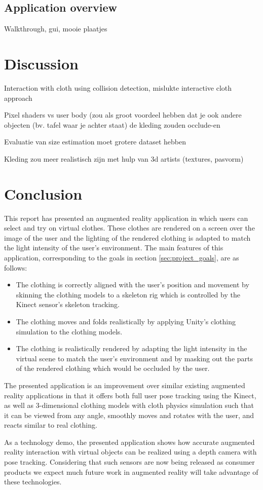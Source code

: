 \documentclass[a4paper]{article}
\begin{document}
\subsection{Application overview}
\label{sec:application_overview}

Walkthrough, gui, mooie plaatjes

\section{Discussion}
\label{sec:discussion}

Interaction with cloth using collision detection, mislukte interactive cloth approach

Pixel shaders vs user body (zou als groot voordeel hebben dat je ook andere objecten (bv. tafel waar je achter staat) de kleding zouden occlude-en

Evaluatie van size estimation moet grotere dataset hebben

Kleding zou meer realistisch zijn met hulp van 3d artists (textures, pasvorm)

\section{Conclusion}
\label{sec:conclusion}

This report has presented an augmented reality application in which users can select and try on virtual clothes. These clothes are rendered on a screen over the image of the user and the lighting of the rendered clothing is adapted to match the light intensity of the user's environment. The main features of this application, corresponding to the goals in section \ref{sec:project_goals}, are as follows:
\begin{itemize}
\item The clothing is correctly aligned with the user's position and movement by skinning the clothing models to a skeleton rig which is controlled by the Kinect sensor's skeleton tracking.
\item The clothing moves and folds realistically by applying Unity's clothing simulation to the clothing models.
\item The clothing is realistically rendered by adapting the light intensity in the virtual scene to match the user's environment and by masking out the parts of the rendered clothing which would be occluded by the user.
\end{itemize}

The presented application is an improvement over similar existing augmented reality applications in that it offers both full user pose tracking using the Kinect, as well as 3-dimensional clothing models with cloth physics simulation such that it can be viewed from any angle, smoothly moves and rotates with the user, and reacts similar to real clothing.

As a technology demo, the presented application shows how accurate augmented reality interaction with virtual objects can be realized using a depth camera with pose tracking. Considering that such sensors are now being released as consumer products we expect much future work in augmented reality will take advantage of these technologies.
\end{document}
